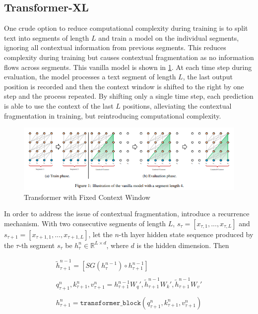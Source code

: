 \documentclass[11pt]{article}
\theoremstyle{definition}
\begin{document}
\subsection{Transformer-XL \cite{dai2019transformerxl}}

One crude option to reduce computational complexity during training is to split text into segments of length $L$ and train a model on the individual segments, ignoring all contextual information from previous segments. This reduces complexity during training but causes contextual fragmentation as no information flows across segments. This vanilla model is shown in \ref{fig:transformerxl-vanilla}. At each time step during evaluation, the model processes a text segment of length $L$, the last output position is recorded and then the context window is shifted to the right by one step and the process repeated. By shifting only a single time step, each prediction is able to use the context of the last $L$ positions, alleviating the contextual fragmentation in training, but reintroducing computational complexity. 

\begin{figure}
\centering
  \includegraphics[width=\textwidth,height=\textheight,keepaspectratio]{transformers/transformerXL_vanilla.png}
  \caption{Transformer with Fixed Context Window \cite{dai2019transformerxl}}
  \label{fig:transformerxl-vanilla}
\end{figure}

In order to address the issue of contextual fragmentation, \cite{dai2019transformerxl} introduce a recurrence mechanism. With two consecutive segments of length $L$, $s_{\tau} = \left[ x_{\tau,1},...,x_{\tau,L} \right]$ and $s_{\tau+1} = \left[x_{\tau+1,1},...,x_{\tau+1,L}\right]$, let the $n$-th layer hidden state sequence produced by the $\tau$-th segment $s_{\tau}$ be $h_{\tau}^n \in \mathbb{R}^{L \times d}$, where $d$ is the hidden dimension. Then

\begin{equation}
\begin{array}{l}
\tilde{h}_{\tau+1}^{n-1} = \left[ SG(h_{\tau}^{n-1}) \circ h_{\tau+1}^{n-1} \right] \\
\\

q_{\tau+1}^n,k_{\tau+1}^n,v_{\tau+1}^n = h_{\tau+1}^{n-1}W_q', \tilde{h}_{\tau+1}^{n-1}W_k', \tilde{h}_{\tau+1}^{n-1}W_v' \\
\\
h_{\tau+1}^n = \mathtt{transformer\_block}(q_{\tau+1}^n,k_{\tau+1}^n,v_{\tau+1}^n)
\end{array}
\end{equation}
\end{document}
